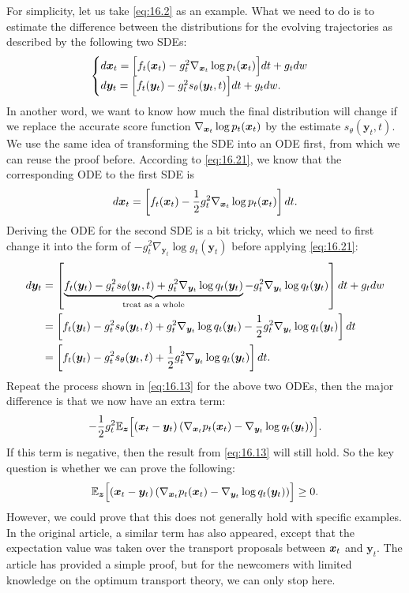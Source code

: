 For simplicity, let us take \cref{eq:16.2} as an example. What we need to do is to estimate the difference between the distributions for the evolving trajectories as described by the following two SDEs:
\begin{equation}
    \label{eq:16.22}
    \begin{cases}
    d\bm{x}_{t}=\Bigl[ f_t(\bm{x}_{t})-g_t^2\nabla_{\bm{x}_{t}}\log p_t (\bm{x}_{t})\Bigr]dt + g_t dw\\
    d\bm{y}_t=\Bigl[ f_t(\bm{y}_t)-g_t^2 s_\theta (\bm{y}_t,t)\Bigr]dt+g_t dw.
    \end{cases}
\end{equation}
In another word, we want to know how much the final distribution will  change if we replace the accurate score function $\nabla_{\bm{x}_{t}}\log p_t (\bm{x}_{t})$ by the estimate $s_\theta (\bm{y}_t,t)$. We use the same idea of transforming the SDE into an ODE first, from which we can reuse the proof before. According to \cref{eq:16.21}, we know that the corresponding ODE to the first SDE is 
\begin{equation}
    \label{eq:16.23}
    d\bm{x}_{t}=\left[ f_t(\bm{x}_{t})-\frac{1}{2}g_t^2\nabla_{\bm{x}_{t}}\log p_t (\bm{x}_{t})\right]dt.
\end{equation}
Deriving the ODE for the second SDE is a bit tricky, which we need to first change it into the form of $-g_t^2\nabla_{\bm{y}_t}\log g_t(\bm{y}_t)$ before applying \cref{eq:16.21}:
\begin{align}
    d\bm{y}_t &=\left[ \underbrace{f_t(\bm{y}_t)-g_t^2 s_\theta(\bm{y}_t,t)+g_t^2\nabla_{\bm{y}_t}\log q_t(\bm{y}_t)}_{\mbox{\scriptsize{treat as a whole}}} -  g_t^2\nabla_{\bm{y}_t}\log q_t(\bm{y}_t)\right]dt+g_t dw\nonumber\\
     &=\left[f_t(\bm{y}_t)-g_t^2 s_\theta(\bm{y}_t,t)+g_t^2\nabla_{\bm{y}_t}\log q_t(\bm{y}_t) -\frac{1}{2}g_t^2\nabla_{\bm{y}_t}\log q_t(\bm{y}_t) \right]dt \nonumber\\
     &=\left[f_t(\bm{y}_t)-g_t^2 s_\theta(\bm{y}_t,t)+\frac{1}{2}g_t^2\nabla_{\bm{y}_t}\log q_t(\bm{y}_t) \right]dt. \label{eq:16.24}
\end{align}
Repeat the process shown in \cref{eq:16.13} for the above two ODEs, then the major difference is that we now have an extra term:
\begin{equation}
    \label{eq:16.25}
    -\frac{1}{2}g_t^2\mathbb{E}_{\bm{z}}\Bigl[ (\bm{x}_{t}-\bm{y}_t)\left( \nabla_{\bm{x}_{t}}p_t(\bm{x}_{t})-\nabla_{\bm{y}_t}\log q_t(\bm{y}_t)\right) \Bigr].
\end{equation}
If this term is negative, then the result from \cref{eq:16.13}  will still hold. So the key question is whether we can prove the following:
\begin{equation*}
    \label{eq:16.26}
    \mathbb{E}_{\bm{z}}\Bigl[ (\bm{x}_{t}-\bm{y}_t)\left( \nabla_{\bm{x}_{t}}p_t(\bm{x}_{t})-\nabla_{\bm{y}_t}\log q_t(\bm{y}_t)\right) \Bigr]\geq 0.
\end{equation*}
However, we could prove that this does not generally hold with specific examples. In the original article, a similar term has also appeared, except that the expectation value was taken over the transport proposals between $\bm{x}_{t}$ and $\bm{y}_t$. The article has provided a simple proof, but for the newcomers with limited knowledge on the optimum transport  theory, we can only stop here.

